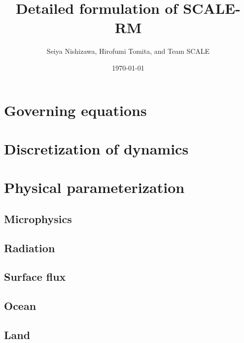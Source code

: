 \documentclass[a4paper]{report}
\title{{\LARGE Detailed formulation of SCALE-RM}}
\author{Seiya Nishizawa, Hirofumi Tomita, and Team SCALE}
\date{\today}
\begin{document}
\maketitle
\tableofcontents



\chapter{Governing equations}


\chapter{Discretization of dynamics}
\label{chap:discretization dynamics}














\chapter{Physical parameterization}



\section{Microphysics}





\section{Radiation}


\section{Surface flux}


\section{Ocean}


\section{Land} \label{sec:land}

\end{document}
